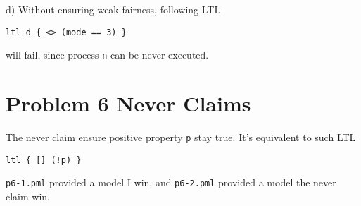 \documentclass{ctexart}
\begin{document}
d) Without ensuring weak-fairness, following LTL
\begin{lstlisting}[frame=single]
ltl d { <> (mode == 3) } 
\end{lstlisting}
will fail, since process \lstinline|n| can be never executed.

\section*{Problem 6 Never Claims}
The never claim ensure positive property \lstinline|p| stay true. It's equivalent to such LTL
\begin{lstlisting}[frame=single]
ltl { [] (!p) }
\end{lstlisting}
\lstinline|p6-1.pml| provided a model I win, and \lstinline|p6-2.pml| provided a model the never claim win.
\end{document}
